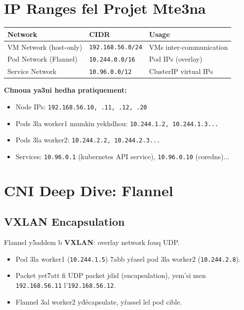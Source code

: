 \documentclass[11pt,a4paper]{book}
\begin{document}
\section{IP Ranges fel Projet Mte3na}

\begin{center}
\begin{tabular}{lll}
\toprule
\textbf{Network} & \textbf{CIDR} & \textbf{Usage} \\
\midrule
VM Network (host-only) & \texttt{192.168.56.0/24} & VMs inter-communication \\
Pod Network (Flannel) & \texttt{10.244.0.0/16} & Pod IPs (overlay) \\
Service Network & \texttt{10.96.0.0/12} & ClusterIP virtual IPs \\
\bottomrule
\end{tabular}
\end{center}

\textbf{Chnoua ya3ni hedha pratiquement:}
\begin{itemize}
  \item Node IPs: \texttt{192.168.56.10, .11, .12, .20}
  \item Pods 3la worker1 mumkin yekhdhou: \texttt{10.244.1.2, 10.244.1.3...}
  \item Pods 3la worker2: \texttt{10.244.2.2, 10.244.2.3...}
  \item Services: \texttt{10.96.0.1} (kubernetes API service), \texttt{10.96.0.10} (coredns)...
\end{itemize}

\section{CNI Deep Dive: Flannel}

\subsection{VXLAN Encapsulation}

Flannel y5addem b \textbf{VXLAN}: overlay network fouq UDP.

\begin{itemize}
  \item Pod 3la worker1 (\texttt{10.244.1.5}) 7abb y\'rasel pod 3la worker2 (\texttt{10.244.2.8}).
  \item Packet yet\'7att fi UDP packet jdid (encapsulation), yem'si men \texttt{192.168.56.11} l'\texttt{192.168.56.12}.
  \item Flannel 3al worker2 y\'d\'ecapsulate, y\'rassel lel pod cible.
\end{itemize}
\end{document}
